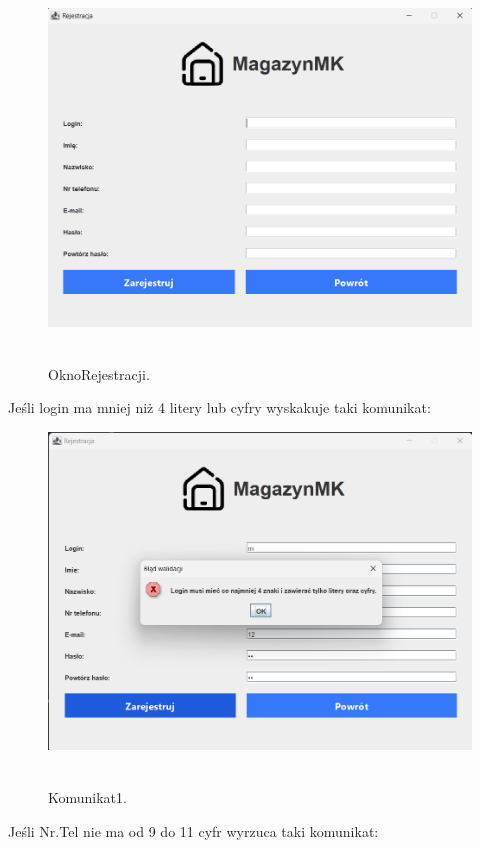 \begin{figure}[H]
    \centering
    \includegraphics[width=.9\linewidth]{figures/OknoRejestracji.png}\
    \caption{OknoRejestracji.\label{OknoRejestracji}}
\end{figure}

Jeśli login ma mniej niż 4 litery lub cyfry wyskakuje taki komunikat:

\begin{figure}[H]
    \centering
    \includegraphics[width=.9\linewidth]{figures/RejestracjaKom1.png}\
    \caption{Komunikat1.\label{Komunikat1}}
\end{figure}

Jeśli Nr.Tel nie ma od 9 do 11 cyfr wyrzuca taki komunikat:

